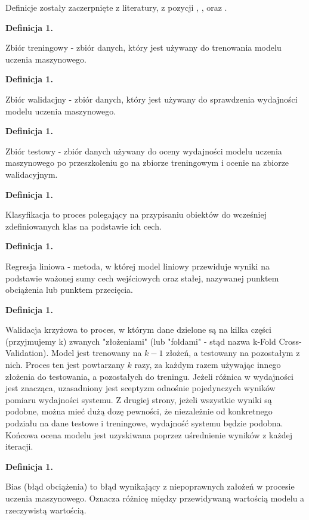 Definicje zostały zaczerpnięte z literatury, z pozycji \cite{Fenner2020}, \cite{Geron2020}, \cite{Seenappa} oraz \cite{vanDerMaaten}.

\newcommand{\mlDefinitionIndex}{1}
\newcommand{\incrementMlDefinitionIndex} {
    \pgfmathtruncatemacro{\mlDefinitionIndex}{\mlDefinitionIndex + 1}
}

\noindent
\textbf{Definicja \mlDefinitionIndex.}
\incrementMlDefinitionIndex
Zbiór treningowy - zbiór danych, który jest używany do trenowania modelu uczenia maszynowego.

\noindent
\textbf{Definicja \mlDefinitionIndex.}
\incrementMlDefinitionIndex
Zbiór walidacjny - zbiór danych, który jest używany do sprawdzenia wydajności modelu uczenia maszynowego.

\noindent
\textbf{Definicja \mlDefinitionIndex.}
\incrementMlDefinitionIndex
Zbiór testowy - zbiór danych używany do oceny wydajności modelu uczenia maszynowego
po przeszkoleniu go na zbiorze treningowym i ocenie na zbiorze walidacyjnym.

\noindent
\textbf{Definicja \mlDefinitionIndex.}
\incrementMlDefinitionIndex
Klasyfikacja to proces polegający na przypisaniu obiektów do wcześniej zdefiniowanych klas na podstawie ich cech.

\noindent
\textbf{Definicja \mlDefinitionIndex.}
\incrementMlDefinitionIndex
Regresja liniowa - metoda, w której model liniowy przewiduje wyniki na podstawie ważonej sumy cech wejściowych oraz stałej,
nazywanej punktem obciążenia lub punktem przecięcia.

\noindent
\textbf{Definicja \mlDefinitionIndex.}
\incrementMlDefinitionIndex
Walidacja krzyżowa to proces, w którym dane dzielone są na kilka części (przyjmujemy k) zwanych "złożeniami"
(lub "foldami" - stąd nazwa k-Fold Cross-Validation). Model jest trenowany na $k-1$ złożeń, a testowany na pozostałym z nich.
Proces ten jest powtarzany $k$ razy, za każdym razem używając innego złożenia do testowania, a pozostałych do treningu.
Jeżeli różnica w wydajności jest znacząca, uzasadniony jest sceptyzm odnośnie pojedynczych wyników pomiaru wydajności systemu.
Z drugiej strony, jeżeli wszystkie wyniki są podobne, można mieć dużą dozę pewności, że niezależnie od konkretnego podziału
na dane testowe i treningowe, wydajność systemu będzie podobna.
Końcowa ocena modelu jest uzyskiwana poprzez uśrednienie wyników z każdej iteracji.

\noindent
\textbf{Definicja \mlDefinitionIndex.}
\incrementMlDefinitionIndex
Bias (błąd obciążenia) to błąd wynikający z niepoprawnych założeń w procesie uczenia maszynowego.
Oznacza różnicę między przewidywaną wartością modelu a rzeczywistą wartością.


